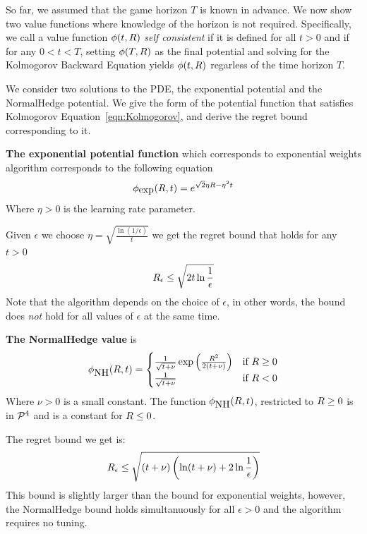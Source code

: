\documentclass{article}[12pt]
\begin{document}
So far, we assumed that the game horizon $T$ is known in advance. We
now show two value functions where knowledge of the horizon is not
required. Specifically, we call a value function $\phi(t,R)$
{\em self consistent} if it is defined for all $t>0$ and if for any
$0<t<T$, setting $\phi(T,R)$ as the final potential and solving for
the Kolmogorov Backward Equation yields $\phi(t,R)$ regarless of the
time horizon $T$. 

We consider two solutions to the PDE, the exponential potential and
the NormalHedge potential. We give the form of the potential function
that satisfies Kolmogorov Equation~\ref{eqn:Kolmogorov}, and derive
the regret bound corresponding to it.

{\bf The exponential potential function} which corresponds to exponential
  weights algorithm corresponds to the following equation
\[
    \phi_{\mbox{exp}}(R,t) = e^{\sqrt{2} \eta R - \eta^2 t}
  \]
  Where $\eta>0$ is the learning rate parameter.
  
Given $\epsilon$ we choose $\eta = \sqrt{\frac{\ln (1/\epsilon)}{t}}$
we get the regret bound that holds for any $t>0$
  \begin{equation}
    R_\epsilon \leq \sqrt{2 t \ln \frac{1}{\epsilon}}
  \end{equation}
Note that the algorithm depends on the choice of $\epsilon$, in other
words, the bound does {\em not} hold for all values of $\epsilon$ at
the same time.

{\bf The NormalHedge value} is
\begin{equation} \label{eqn:NormalHedge}
  \phi_{\mbox{NH}}(R,t) = \begin{cases}
    \frac{1}{\sqrt{t+\nu}}\exp\left(\frac{R^2}{2(t+\nu)}\right)
    & \mbox{if } R \geq 0  \\
  \frac{1}{\sqrt{t+\nu}} & \mbox{if } R <0
  \end{cases}
\end{equation}
Where $\nu>0$ is a small constant. The function $\phi_{\mbox{NH}}(R,t)$,
restricted to $R\geq 0$ is in ${\cal P}^{4}$ and is a constant for $R \leq 0$.

The regret bound we get is:
\begin{equation}
R_\epsilon \leq \sqrt{(t+\nu) \left( \ln (t+\nu) + 2 \ln \frac{1}{\epsilon}\right)}
\end{equation}
This bound is slightly larger than the bound for exponential weights,
however, the NormalHedge bound holds simultanuously for all
$\epsilon>0$ and the algorithm requires no tuning.
\end{document}
